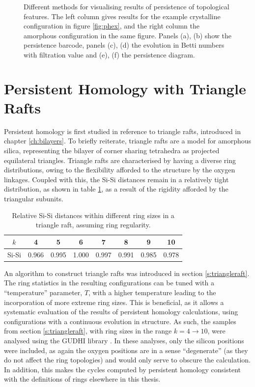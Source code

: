\begin{figure}[tbp]
	\caption{Different methods for visualising results of persistence of topological features. The left column gives results for the example crystalline configuration in figure \ref{fig:phex}, and the right column the amorphous configuration in the same figure. Panels (a), (b) show the persistence barcode, panels (c), (d) the evolution in Betti numbers with filtration value and (e), (f) the persistence diagram.}
	\label{fig:exvis}
\end{figure}

\section{Persistent Homology with Triangle Rafts}

Persistent homology is first studied in reference to triangle rafts, introduced in chapter \ref{ch:bilayers}.
To briefly reiterate, triangle rafts are a model for \td{} amorphous silica, representing the bilayer of corner sharing tetrahedra as projected equilateral triangles.
Triangle rafts are characterised by having a diverse ring distributions, owing to the flexibility afforded to the structure by the oxygen linkages.
Coupled with this, the Si\--Si distances remain in a relatively tight distribution, as shown in table \ref{tab:trsidist}, as a result of the rigidity afforded by the triangular subunits.

\begin{table}[hbt]
\centering
\caption{Relative Si\--Si distances within different ring sizes in a triangle raft, assuming ring regularity.}
\label{tab:trsidist}
\begin{tabular}{cccccccc}
\toprule
$k$ & 4 & 5 & 6 & 7 & 8 & 9 & 10 \\
\midrule
Si\--Si & 0.966 & 0.995 & 1.000 & 0.997 & 0.991 & 0.985 & 0.978 \\
\bottomrule
\end{tabular}
\end{table}

An algorithm to construct triangle rafts was introduced in section \ref{s:triangleraft}.
The ring statistics in the resulting configurations can be tuned with a ``temperature'' parameter, $T$, with a higher temperature leading to the incorporation of more extreme ring sizes.
This is beneficial, as it allows a systematic evaluation of the results of persistent homology calculations, using configurations with a continuous evolution in structure.
As such, the samples from section \ref{s:triangleraft}, with ring sizes in the range $k=4\rightarrow10$, were analysed using the GUDHI library \cite{gudhi}.
In these analyses, only the silicon positions were included, as again the oxygen positions are in a sense ``degenerate'' (as they do not affect the ring topologies) and would only serve to obscure the calculation.
In addition, this makes the cycles computed by persistent homology consistent with the definitions of rings elsewhere in this thesis.

